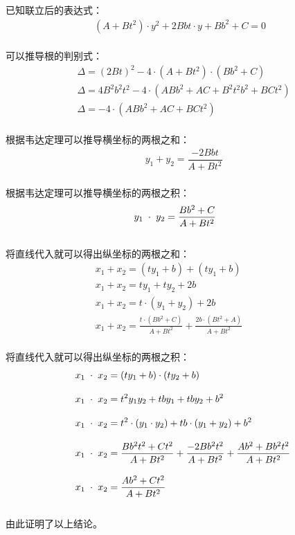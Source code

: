 \documentclass[UTF8]{ctexart}
\begin{document}
    已知联立后的表达式：
    \begin{align}
        \left(A+Bt^2\right)\cdot y^2+2Bbt\cdot y+Bb^2+C=0
    \end{align}\\
    可以推导根的判别式：
    \begin{align}
        &\Delta=(2Bt)^2-4\cdot\left(A+Bt^2\right)\cdot\left(Bb^2+C\right)\\[3mm]
        &\Delta=4B^2b^2t^2-4\cdot\left(ABb^2+AC+B^2t^2b^2+BCt^2\right)\\[3mm]
        &\Delta=-4\cdot\left(ABb^2+AC+BCt^2\right)
    \end{align}\\
    根据韦达定理可以推导横坐标的两根之和：
    \begin{align}
        &y_1+y_2=\dfrac{-2Bbt}{A+Bt^2}
    \end{align}\\
    根据韦达定理可以推导横坐标的两根之积：
    \begin{align}
        &y_1\hspace{3.0pt}\cdot\hspace{3.0pt}y_2=\dfrac{Bb^2+C}{A+Bt^2}
    \end{align}\\    
    将直线代入就可以得出纵坐标的两根之和：\vspace{3pt}
    \begin{align}
        &x_1+x_2=(ty_1+b)+(ty_1+b)\\[3mm]
        &x_1+x_2=ty_1+ty_2+2b\\[3mm]
        &x_1+x_2=t\cdot(y_1+y_2)+2b\\[3mm]
        &x_1+x_2=\frac{t\cdot(Bb^2+C)}{A+Bt^2}+\frac{2b\cdot(Bt^2+A)}{A+Bt^2}~~~~~~~~~~~~~~
    \end{align}\\
    将直线代入就可以得出纵坐标的两根之积：\vspace{3pt}
    \begin{align}
        &~~x_1\hspace{3.0pt}\cdot\hspace{3.0pt}x_2=(ty_1+b)\cdot(ty_2+b)\\[3mm]
        &~~x_1\hspace{3.0pt}\cdot\hspace{3.0pt}x_2=t^2y_1y_2+tby_1+tby_2+b^2\\[3mm]
        &~~x_1\hspace{3.0pt}\cdot\hspace{3.0pt}x_2=t^2\cdot(y_1\cdot y_2)+tb\cdot(y_1+y_2)+b^2\\[3mm]
        &~~x_1\hspace{3.0pt}\cdot\hspace{3.0pt}x_2=\frac{Bb^2t^2+Ct^2}{A+Bt^2}+\frac{-2Bb^2t^2}{A+Bt^2}+\frac{Ab^2+Bb^2t^2}{A+Bt^2}\\[3mm]
        &~~x_1\hspace{3.0pt}\cdot\hspace{3.0pt}x_2=\frac{Ab^2+Ct^2}{A+Bt^2}
    \end{align}\\
    由此证明了以上结论。
\end{document}
